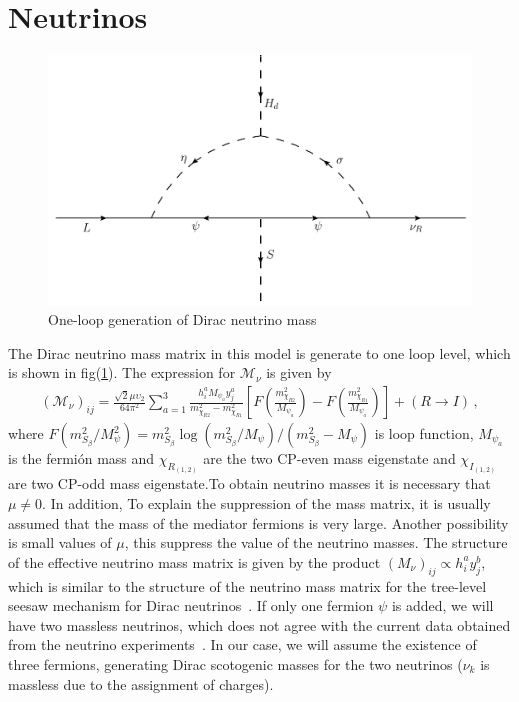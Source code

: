 \documentclass[12pt]{article}
\begin{document}
\section{Neutrinos}
\label{sec:Neutrinos}
%
\begin{figure}
\centering
\includegraphics[scale=0.75]{Neutrino_Loop.pdf}
\caption{One-loop generation of Dirac neutrino mass}
\label{fig:zee}
\end{figure}
%
 The Dirac neutrino mass matrix in this model is generate to one loop level, which is shown in fig(\ref{fig:zee}). The expression for $\mathcal{M}_{\nu}$ is given by~\cite{Reig:2018mdk}
%
\begin{align}
(\mathcal{M}_{\nu})_{ij} = \frac{\sqrt{2}\mu \upsilon_{2}}{64 \pi^{2}} \sum_{a=1}^{3} \frac{h_{i}^{a} M_{\psi_{a}}y_{j}^{a}}{m_{\chi_{R2}}^{2}-m_{\chi_{R1}}^{2}} \left[ F\left( \frac{m_{\chi_{R2}}^{2}}{M_{\psi_{a}}} \right) - F\left( \frac{m_{\chi_{R1}}^{2}}{M_{\psi_{a}}} \right) \right] + (R \to I)\,,
\end{align}
%
where $F(m_{S_{\beta}}^{2}/M_{\psi}^{2}) = m_{S_{\beta}}^{2}\log(m_{S_{\beta}}^{2}/M_{\psi})/(m_{S_{\beta}}^{2}-M_{\psi})$ is loop function, $M_{\psi_{a}}$ is the fermión mass  and $\chi_{R_(1,2)}$ are the two CP-even mass eigenstate and $\chi_{I_{(1,2)}}$ are two CP-odd mass eigenstate.To obtain neutrino masses it is necessary that $\mu \neq 0$. In addition, To explain the suppression of the mass matrix, it is usually assumed that the mass of the mediator fermions is very large. Another possibility is small values of $\mu$, this suppress the value of the neutrino masses. The structure of the effective neutrino mass matrix is given by the product $(M_{\nu})_{ij} \propto h^{a}_{i} y^{b}_{j}$, which is similar to the structure of the neutrino mass matrix for the tree-level seesaw mechanism for Dirac neutrinos~\cite{Chulia:2016ngi}. If only one fermion $\psi$ is added, we will have two massless neutrinos, which does not agree with the current data obtained from the neutrino experiments~\cite{deSalas:2017kay}. In our case, we will assume the existence of three fermions, generating Dirac scotogenic masses for the two neutrinos ($\nu_{k}$ is massless due to the assignment of charges).
\end{document}
